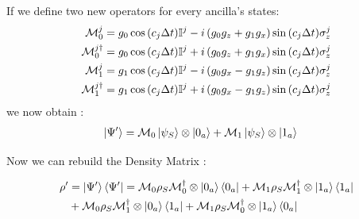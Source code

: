 \documentclass[a4paper,12pt]{article}
\begin{document}
	If we define two new operators for every ancilla's states:
	\begin{align}
		\mathcal{M}_{0}^{j} &= g_0 \cos{\left(c_j \Delta t \right)} \mathbb{I}^{j} - i \left(g_0 g_z + g_1 g_x \right) \sin{\left(c_j \Delta t \right)} \sigma_{z}^{j} \label{eq:M0_definition} \\
		\mathcal{M}_{0}^{j \dagger} &= g_0 \cos{\left(c_j \Delta t \right)} \mathbb{I}^{j} + i \left(g_0 g_z + g_1 g_x \right) \sin{\left(c_j \Delta t \right)} \sigma_{z}^{j} \notag\\
		\mathcal{M}_{1}^{j} &= g_1 \cos{\left(c_j \Delta t \right)} \mathbb{I}^{j} - i \left(g_0 g_x - g_1 g_z \right) \sin{\left(c_j \Delta t \right)} \sigma_{z}^{j} \label{eq:M1_definition} \\
		\mathcal{M}_{1}^{j \dagger} &= g_1 \cos{\left(c_j \Delta t \right)} \mathbb{I}^{j} + i \left(g_0 g_x - g_1 g_z \right) \sin{\left(c_j \Delta t \right)} \sigma_{z}^{j} \notag
	\end{align}
	we now obtain :
	\begin{align}
		\ket{\Psi'} &= \mathcal{M}_0 \ket{\psi_S} \otimes \ket{0_a} + \mathcal{M}_1 \ket{\psi_S} \otimes \ket{1_a}
		\label{eq:MO_M1_psi_evo}
	\end{align}
	
	\newpage
	
	Now we can rebuild the Density Matrix :

	\begin{align}
		\rho' &= \ket{\Psi'}\bra{\Psi'} = \mathcal{M}_{0} \rho_S \mathcal{M}_{0}^{\dagger} \otimes \ket{0_a}\bra{0_a} + \mathcal{M}_{1} \rho_S \mathcal{M}_{1}^{\dagger} \otimes \ket{1_a} \bra{1_a} \notag \\
		& + \mathcal{M}_{0} \rho_S \mathcal{M}_{1}^{\dagger} \otimes \ket{0_a} \bra{1_a} + \mathcal{M}_{1} \rho_S \mathcal{M}_{0}^{\dagger} \otimes \ket{1_a} \bra{0_a}
		\label{eq:MO_M1_rho_int}
	\end{align}
\end{document}
